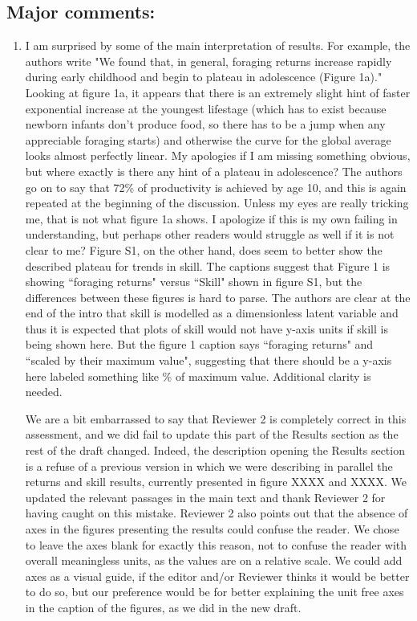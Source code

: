 \documentclass{article}
\newcommand{\rev}[1]{{\color{ForestGreen}#1}}
\begin{document}
\subsection{Major comments:}
\begin{enumerate}
    \item  I am surprised by some of the main interpretation of results. For example, the authors write "We found that, in general, foraging returns increase rapidly during early childhood and begin to plateau in adolescence (Figure 1a)." Looking at figure 1a, it appears that there is an extremely slight hint of faster exponential increase at the youngest lifestage (which has to exist because  newborn infants don't produce food, so there has to be a jump when any appreciable foraging starts) and otherwise the curve for the global average looks almost perfectly linear. My apologies if I am missing something obvious, but where exactly is there any hint of a plateau in adolescence? The authors go on to say that 72\% of productivity is achieved by age 10, and this is again repeated at the beginning of the discussion. Unless my eyes are really tricking me, that is not  what figure 1a shows. I apologize if this is my own failing in understanding, but perhaps other  readers would struggle as well if it is not clear to me? Figure S1, on the other hand, does seem to better show the described plateau for trends in skill. The captions suggest that Figure 1 is showing ``foraging returns" versus ``Skill" shown in figure S1, but the differences between these figures is hard to parse. The authors are clear at the end of  the intro that skill is modelled as a dimensionless latent variable and thus it is expected that plots of skill would not have y-axis units if skill is being shown here. But the figure 1 caption says ``foraging returns" and ``scaled by their maximum value", suggesting that there should be a y-axis here labeled something like \% of maximum value. Additional clarity is needed.
    
\rev{We are a bit embarrassed to say that Reviewer 2 is completely correct in this assessment, and we did fail to update this part of the Results section as the rest of the draft changed. Indeed, the description opening the Results section is a refuse of a previous version in which we were describing in parallel the returns and skill results, currently presented in figure XXXX and XXXX. We updated the relevant passages in the main text and thank Reviewer 2 for having caught on this mistake. Reviewer 2 also points out that the absence of axes in the figures presenting the results could confuse the reader. We chose to leave the axes blank for exactly this reason, not to confuse the reader with overall meaningless units, as the values are on a relative scale. We could add axes as a visual guide, if the editor and/or Reviewer thinks it would be better to do so, but our preference would be for better explaining the unit free axes in the caption of the figures, as we did in the new draft.}


\end{enumerate}
\end{document}

